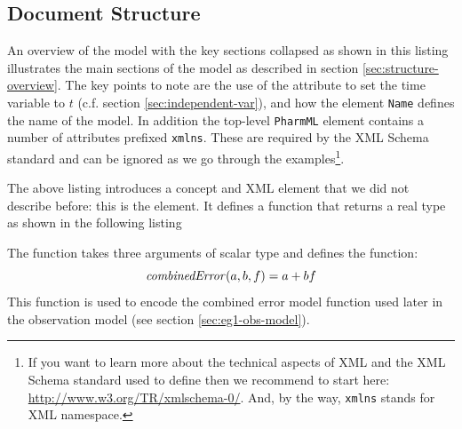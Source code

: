 \subsection{\pharmml Document Structure}
\label{sec:symbol-defn}
An overview of the model with the key sections collapsed  as shown in this listing
illustrates the main sections of the model as described
in section \ref{sec:structure-overview}. The key points to note are
the use of the   attribute to set the time
variable to $t$ (c.f.\xspace section \ref{sec:independent-var}), and
how the element \texttt{Name} defines the name of the model. In addition
the top-level \texttt{PharmML} element contains a number of attributes
prefixed \texttt{xmlns}. These are required by the XML Schema standard
and can be ignored as we go through the examples\footnote{If you
  want to learn more about the technical aspects of XML and the XML Schema standard
  used to define \pharmml then we recommend to start here:
  \url{http://www.w3.org/TR/xmlschema-0/}. And, by the way,
  \texttt{xmlns} stands for XML namespace.}.


The above listing introduces a concept and XML element that we did not describe
before: this is the  element. It defines a function that
returns a real type as shown in the following listing 

The function takes three arguments of scalar type and defines the
function:
\begin{displaymath}
\var{combinedError}(a, b, f) = a + bf
\end{displaymath}
This function is used to encode the combined error model function used later in
the observation model (see section \ref{sec:eg1-obs-model}).


%
%
%


